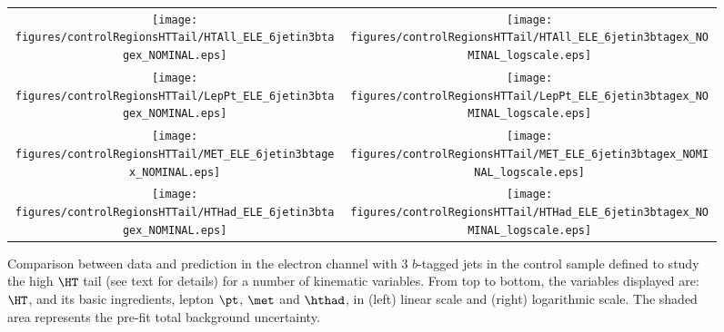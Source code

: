 \begin{figure}[htbp]
\begin{center}
\begin{tabular}{cc}
%
\texttt{[image: figures/controlRegionsHTTail/HTAll\_ELE\_6jetin3btagex\_NOMINAL.eps]} &
\texttt{[image: figures/controlRegionsHTTail/HTAll\_ELE\_6jetin3btagex\_NOMINAL\_logscale.eps]} \\
\texttt{[image: figures/controlRegionsHTTail/LepPt\_ELE\_6jetin3btagex\_NOMINAL.eps]} &
\texttt{[image: figures/controlRegionsHTTail/LepPt\_ELE\_6jetin3btagex\_NOMINAL\_logscale.eps]} \\
\texttt{[image: figures/controlRegionsHTTail/MET\_ELE\_6jetin3btagex\_NOMINAL.eps]} &
\texttt{[image: figures/controlRegionsHTTail/MET\_ELE\_6jetin3btagex\_NOMINAL\_logscale.eps]} \\
\texttt{[image: figures/controlRegionsHTTail/HTHad\_ELE\_6jetin3btagex\_NOMINAL.eps]} &
\texttt{[image: figures/controlRegionsHTTail/HTHad\_ELE\_6jetin3btagex\_NOMINAL\_logscale.eps]} \\

\end{tabular}\caption{\small {Comparison between data and prediction in the electron channel with 3 $b$-tagged jets in the control sample
defined to study the high $\HT$ tail (see text for details)  for a number of kinematic
variables. From top to bottom, the variables displayed are: $\HT$, and its basic ingredients, lepton $\pt$, $\met$ and $\hthad$,
in (left) linear scale and (right) logarithmic scale.
The shaded area represents the pre-fit total background uncertainty.}}
\label{fig:ELE_controlHTTail_3btagex_1}
\end{center}
\end{figure}
